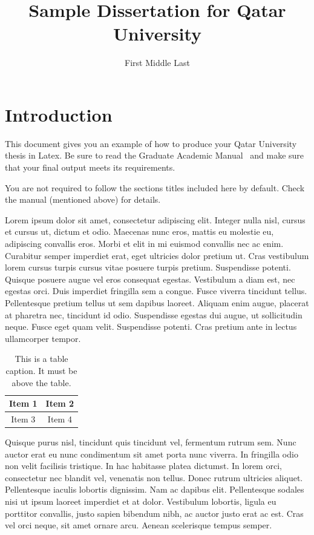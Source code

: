 \documentclass[12pt,lot,lof]{quthesis}
\title{Sample Dissertation for Qatar University}
\author{First Middle Last} %
\begin{document}
\makefrontmatter

\chapter{Introduction}
This document gives you an example of how to produce your Qatar 
University thesis in Latex.  Be sure to read the 
Graduate Academic Manual~\cite{qugam} and make sure that your
final output meets its requirements.

You are not required to follow the sections titles included here by default.
Check the manual (mentioned above) for details.

Lorem ipsum dolor sit amet, consectetur adipiscing elit. Integer nulla nisl, cursus et cursus ut, dictum et odio. Maecenas nunc eros, mattis eu molestie eu, adipiscing convallis eros. Morbi et elit in mi euismod convallis nec ac enim. Curabitur semper imperdiet erat, eget ultricies dolor pretium ut. Cras vestibulum lorem cursus turpis cursus vitae posuere turpis pretium. Suspendisse potenti. Quisque posuere augue vel eros consequat egestas. Vestibulum a diam est, nec egestas orci. Duis imperdiet fringilla sem a congue. Fusce viverra tincidunt tellus. Pellentesque pretium tellus ut sem dapibus laoreet. Aliquam enim augue, placerat at pharetra nec, tincidunt id odio. Suspendisse egestas dui augue, ut sollicitudin neque. Fusce eget quam velit. Suspendisse potenti. Cras pretium ante in lectus ullamcorper tempor.

\begin{table}[t]
\centering
\caption{This is a table caption.  It must be above the table.}
\begin{tabular}{|c|c|}
\hline
Item 1 & Item 2 \\
\hline
Item 3 & Item 4 \\
\hline
\end{tabular}
\end{table}

Quisque purus nisl, tincidunt quis tincidunt vel, fermentum rutrum sem. Nunc auctor erat eu nunc condimentum sit amet porta nunc viverra. In fringilla odio non velit facilisis tristique. In hac habitasse platea dictumst. In lorem orci, consectetur nec blandit vel, venenatis non tellus. Donec rutrum ultricies aliquet. Pellentesque iaculis lobortis dignissim. Nam ac dapibus elit. Pellentesque sodales nisi ut ipsum laoreet imperdiet et at dolor. Vestibulum lobortis, ligula eu porttitor convallis, justo sapien bibendum nibh, ac auctor justo erat ac est. Cras vel orci neque, sit amet ornare arcu. Aenean scelerisque tempus semper.
\end{document}
